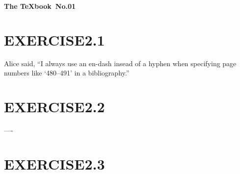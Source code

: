 \documentclass[leqno]{ltjsarticle}%
\begin{document}
\textbf{\LARGE{The \TeX book}\ \Large{No.01}}\hspace{\fill} 
\section*{EXERCISE2.1}
  Alice said, ``I always use an en-dash insead of a hyphen when specifying page numbers like `480--491' in a bibliography.''
\section*{EXERCISE2.2}
  ----
\section*{EXERCISE2.3}
\end{document}
